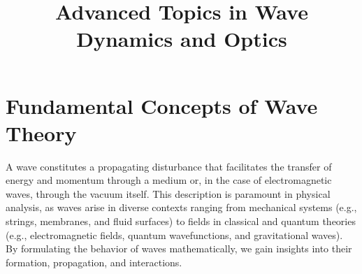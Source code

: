 \documentclass{article}
\title{Advanced Topics in Wave Dynamics and Optics}
\author{}
\date{}
\begin{document}
\maketitle

\section{Fundamental Concepts of Wave Theory}
A wave constitutes a propagating disturbance that facilitates the transfer of energy and momentum through a medium or, in the case of electromagnetic waves, through the vacuum itself. This description is paramount in physical analysis, as waves arise in diverse contexts ranging from mechanical systems (e.g., strings, membranes, and fluid surfaces) to fields in classical and quantum theories (e.g., electromagnetic fields, quantum wavefunctions, and gravitational waves). By formulating the behavior of waves mathematically, we gain insights into their formation, propagation, and interactions.
\end{document}
